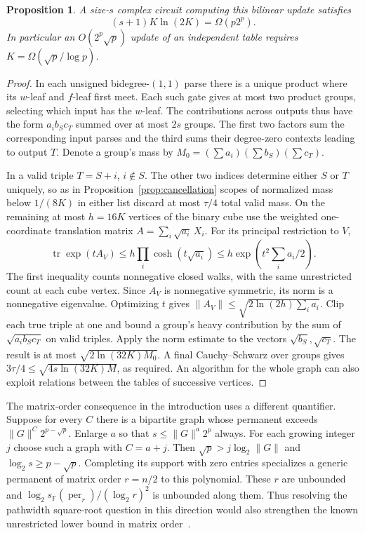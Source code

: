 \documentclass[11pt]{article}
\newtheorem{proposition}[theorem]{Proposition}
\theoremstyle{definition}
\newcommand{\F}{\mathbb F}
\newcommand{\per}{\operatorname{per}}
\begin{document}
\begin{proposition}\label{prop:update-mass}
A size-\(s\) complex circuit computing this bilinear update satisfies
\[
                       (s+1)K\ln(2K)=\Omega(p2^p).
\]
In particular an \(O(2^p\sqrt p)\) update of an independent table requires \(K=\Omega(\sqrt p/\log p)\).
\end{proposition}
\begin{proof}
In each unsigned bidegree-\((1,1)\) parse there is a unique product where its \(w\)-leaf and \(f\)-leaf first meet. Each such gate gives at most two product groups, selecting which input has the \(w\)-leaf. The contributions across outputs thus have the form \(a_i b_S c_T\) summed over at most \(2s\) groups. The first two factors sum the corresponding input parses and the third sums their degree-zero contexts leading to output \(T\). Denote a group's mass by \(M_0=(\sum a_i)(\sum b_S)(\sum c_T)\).

In a valid triple \(T=S+i\), \(i\notin S\). The other two indices determine either \(S\) or \(T\) uniquely, so as in Proposition~\ref{prop:cancellation} scopes of normalized mass below \(1/(8K)\) in either list discard at most \(\tau/4\) total valid mass. On the remaining at most \(h=16K\) vertices of the binary cube use the weighted one-coordinate translation matrix \(A=\sum_i\sqrt{a_i}\,X_i\). For its principal restriction to \(V\),
\[
 \operatorname{tr}\exp(tA_V)
    \le h\prod_i\cosh(t\sqrt{a_i})
    \le h\exp(t^2\textstyle\sum_i a_i/2).
\]
The first inequality counts nonnegative closed walks, with the same unrestricted count at each cube vertex. Since \(A_V\) is nonnegative symmetric, its norm is a nonnegative eigenvalue. Optimizing \(t\) gives \(\|A_V\|\le\sqrt{2\ln(2h)\sum_i a_i}\). Clip each true triple at one and bound a group's heavy contribution by the sum of \(\sqrt{a_i b_S c_T}\) on valid triples. Apply the norm estimate to the vectors \(\sqrt{b_S},\sqrt{c_T}\). The result is at most \(\sqrt{2\ln(32K)M_0}\). A final Cauchy--Schwarz over groups gives \(3\tau/4\le\sqrt{4s\ln(32K)M}\), as required. An algorithm for the whole graph can also exploit relations between the tables of successive vertices.
\end{proof}

The matrix-order consequence in the introduction uses a different quantifier. Suppose for every \(C\) there is a bipartite graph whose permanent exceeds \(\|G\|^C2^{p-\sqrt p}\). Enlarge \(a\) so that \(s\le \|G\|^a2^p\) always. For each growing integer \(j\) choose such a graph with \(C=a+j\). Then \(\sqrt p>j\log_2 \|G\|\) and \(\log_2 s\ge p-\sqrt p\). Completing its support with zero entries specializes a generic permanent of matrix order \(r=n/2\) to this polynomial. These \(r\) are unbounded and \(\log_2 s_{\F}(\per_r)/(\log_2 r)^2\) is unbounded along them. Thus resolving the pathwidth square-root question in this direction would also strengthen the known unrestricted lower bound in matrix order~\cite{circuits}.


{\small

}
\end{document}
